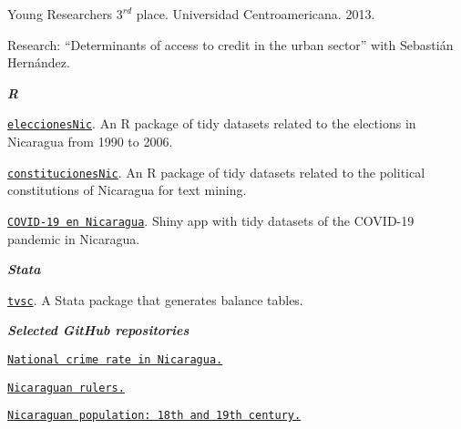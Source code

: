 \documentclass[11pt,article,oneside, a4paper]{memoir}
\begin{document}
\ind Young Researchers $3^{rd}$ place. Universidad Centroamericana. 2013. 

\ind \hspace{0.35in} \footnotesize Research: ``Determinants of access to credit in the urban sector'' with Sebastián Hernández. \normalsize \vspace{0.01in}

\medskip

\noindent\emph{\textbf{R} \vspace{0.05in}}

\ind \texttt{\href{https://github.com/RRMaximiliano/eleccionesNic}{eleccionesNic}}. An R package of tidy datasets related to the elections in Nicaragua from 1990 to 2006.

\ind \texttt{\href{https://github.com/RRMaximiliano/constitucionesNic}{constitucionesNic}}. An R package of tidy datasets related to the political constitutions of Nicaragua for text mining.

\ind \texttt{\href{https://rrmaximiliano.shinyapps.io/covid-nicaragua/}{COVID-19 en Nicaragua}}. Shiny app with tidy datasets of the COVID-19 pandemic in Nicaragua.

\medskip
\noindent\emph{\textbf{Stata} \vspace{0.05in}}

\ind \texttt{\href{https://github.com/RRMaximiliano/tvsc}{tvsc}}. A Stata package that generates balance tables.

\medskip
\noindent\emph{\textbf{Selected GitHub repositories} \vspace{0.05in}}

\ind \texttt{\href{https://github.com/RRMaximiliano/policia-nacional-nic-stats}{National crime rate in Nicaragua.}}

\ind \texttt{\href{https://github.com/RRMaximiliano/nicaraguan-rulers}{Nicaraguan rulers.}}

\ind \texttt{\href{https://github.com/RRMaximiliano/poblacion-nicaragua-siglo-18-19}{Nicaraguan population: 18th and 19th century.}} 

\medskip
\end{document}
